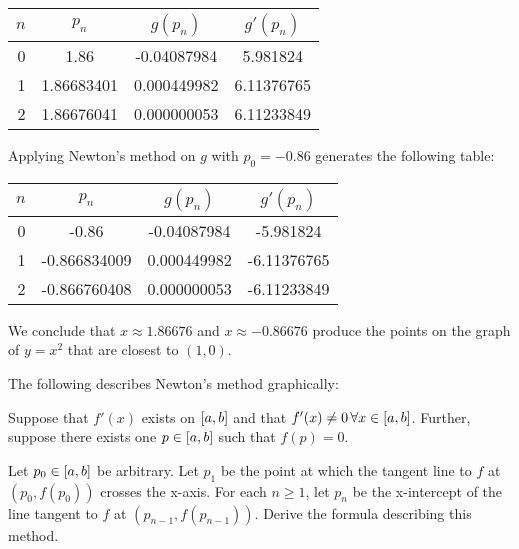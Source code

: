 \documentclass[../../../../Assignments]{subfiles}
\begin{document}
\begin{solution}
    \begin{table}[H]
        \centering
        \begin{tabular}{r S[table-format=1.8] S[table-format=-1.9] S[table-format=1.8]}
            \toprule
            \(n\)  &   {\(p_n\)}   &  {\(g(p_n)\)}  &  {\(g'(p_n)\)}  \\
              &  1.86         &  -0.04087984   &  5.981824       \\
                1  &  1.86683401   &   0.000449982  &  6.11376765     \\
                2  &  1.86676041   &   0.000000053  &  6.11233849     \\
            \bottomrule
        \end{tabular}
    \end{table}

    Applying Newton's method on \(g\) with \(p_0 = \num{-0.86}\) generates the
    following table:

    \begin{table}[H]
        \centering
        \begin{tabular}{r S[table-format=-1.9] S[table-format=-1.9] S[table-format=-1.8]}
            \toprule
            \(n\)  &    {\(p_n\)}   &  {\(g(p_n)\)}  &  {\(g'(p_n)\)}  \\
              &  -0.86         &  -0.04087984   &  -5.981824      \\
                1  &  -0.866834009  &   0.000449982  &  -6.11376765    \\
                2  &  -0.866760408  &   0.000000053  &  -6.11233849    \\
            \bottomrule
        \end{tabular}
    \end{table}

    We conclude that \(x \approx \num{1.86676}\) and \(x \approx
    \num{-0.86676}\) produce the points on the graph of \(y = x^2\) that are
    closest to \((1, 0)\).
\end{solution}

\begin{exercise}
    The following describes Newton's method graphically:

    Suppose that \(f'(x)\) exists on \(\interval{a}{b}\) and that \(f'(x) \neq 0
    \, \forall x \in \interval{a}{b}\). Further, suppose there exists one \(p
    \in \interval{a}{b}\) such that \(f(p) = 0\).

    Let \(p_0 \in \interval{a}{b}\) be arbitrary. Let \(p_1\) be the point at
    which the tangent line to \(f\) at \((p_0, f(p_0))\) crosses the x-axis. For
    each \(n \geq 1\), let \(p_n\) be the x-intercept of the line tangent to
    \(f\) at \((p_{n - 1}, f(p_{n - 1}))\). Derive the formula describing this
    method.
\end{exercise}
\end{document}
